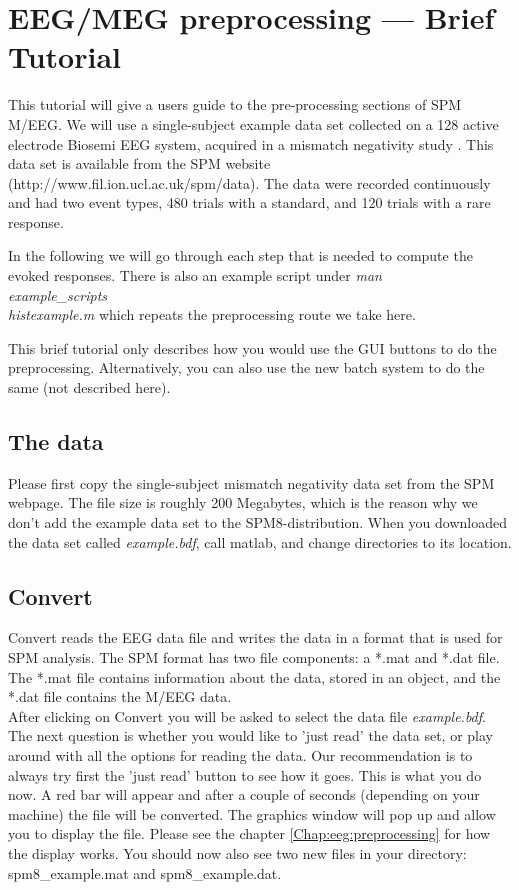 \chapter{EEG/MEG preprocessing --- Brief Tutorial}
\label{ch:eeg_tutorial}
This tutorial will give a users guide to the pre-processing sections
of SPM M/EEG. We will use a single-subject example data set collected on a 128 active
electrode Biosemi EEG system, acquired in a mismatch negativity study \cite{mg_dcm_repro}. This data set is available from the SPM website (http://www.fil.ion.ucl.ac.uk/spm/data). The data were recorded continuously and had two event types, 480 trials with a standard, and 120 trials with a rare response.

In the following we will go through each step that is needed to compute the evoked responses. There is also an example script under \textit{man\\example\_scripts\\histexample.m} which repeats the preprocessing route we take here.

This brief tutorial only describes how you would use the GUI buttons to do the preprocessing. Alternatively, you can also use the new batch system to do the same (not described here).

\section{The data}
Please first copy the single-subject mismatch negativity data set from the SPM webpage. The file size is roughly 200 Megabytes, which is the reason why we don't add the example data set to the SPM8-distribution. When you downloaded the data set called \textit{example.bdf}, call matlab, and change directories to its location.

\section{Convert}
Convert reads the EEG data file and writes the data in a format that
is used for SPM analysis. The SPM format has two file components: a *.mat
and *.dat file. The *.mat file contains information about the data, stored in an object, and the *.dat file contains the M/EEG data.\\

After clicking on Convert you will be asked to select the data file \textit{example.bdf}. The next question is whether you would like to 'just read' the data set, or play around with all the options for reading the data. Our recommendation is to always try first the 'just read' button to see how it goes. This is what you do now. A red bar will appear and after a couple of seconds (depending on your machine) the file will be converted. The graphics window will pop up and allow you to display the file. Please see the chapter \ref{Chap:eeg:preprocessing} for how the display works. You should now also see two new files in your directory: spm8\_example.mat and spm8\_example.dat.

